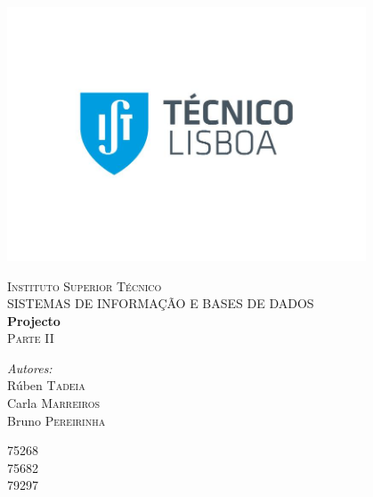 \begin{titlepage}
\begin{center}

\vspace*{-2cm}\includegraphics[width=0.8\textwidth]{./IST}

\textsc{\Large Instituto Superior Técnico}\\[1cm]

\textsc{\large SISTEMAS DE INFORMAÇÃO E BASES DE DADOS}\\[1cm]

{ \huge \bfseries Projecto}
\\[2cm]
\textsc{\large Parte II}\\[1cm]

\noindent
\begin{minipage}{0.4\textwidth}
\begin{flushleft} \large
\emph{Autores:}\\
Rúben\textsc{ Tadeia}\\
Carla\textsc{ Marreiros}\\
Bruno\textsc{ Pereirinha}\\
\end{flushleft}
\end{minipage}%
\begin{minipage}{0.4\textwidth}
\begin{flushright} \large
75268\\
75682\\
79297\\
\end{flushright}
\end{minipage}
\\[1.5cm]


\end{center}
\end{titlepage}
